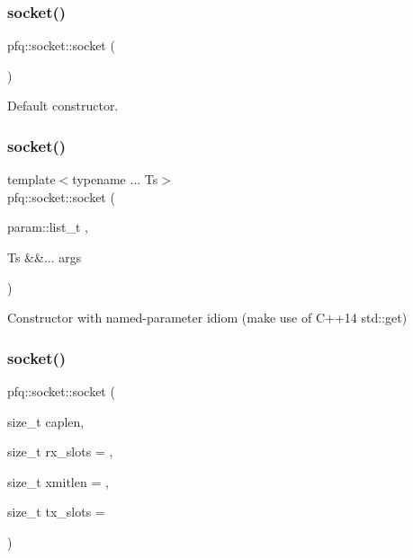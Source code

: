 \subsubsection{\texorpdfstring{socket()}{socket()}\hspace{0.1cm}{\footnotesize\ttfamily [1/7]}}
{\footnotesize\ttfamily pfq\+::socket\+::socket (\begin{DoxyParamCaption}{ }\end{DoxyParamCaption})\hspace{0.3cm}{\ttfamily [inline]}}



Default constructor. 

\mbox{\label{classpfq_1_1socket_aa53695f39b45a0fa9520d52a1a35d2bf}} 
\subsubsection{\texorpdfstring{socket()}{socket()}\hspace{0.1cm}{\footnotesize\ttfamily [2/7]}}
{\footnotesize\ttfamily template$<$typename ... Ts$>$ \\
pfq\+::socket\+::socket (\begin{DoxyParamCaption}\item[{param\+::list\+\_\+t}]{,  }\item[{Ts \&\&...}]{args }\end{DoxyParamCaption})\hspace{0.3cm}{\ttfamily [inline]}}



Constructor with named-\/parameter idiom (make use of C++14 std\+::get) 

\mbox{\label{classpfq_1_1socket_af2e952a1d5933ea76db2fbbba0fdf92a}} 
\subsubsection{\texorpdfstring{socket()}{socket()}\hspace{0.1cm}{\footnotesize\ttfamily [3/7]}}
{\footnotesize\ttfamily pfq\+::socket\+::socket (\begin{DoxyParamCaption}\item[{size\+\_\+t}]{caplen,  }\item[{size\+\_\+t}]{rx\+\_\+slots = {},  }\item[{size\+\_\+t}]{xmitlen = {},  }\item[{size\+\_\+t}]{tx\+\_\+slots = {} }\end{DoxyParamCaption})\hspace{0.3cm}{\ttfamily [inline]}}



